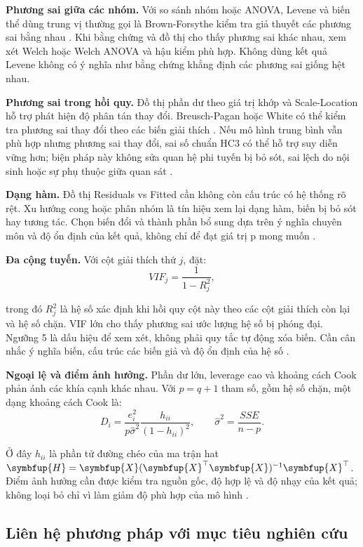 \textbf{Phương sai giữa các nhóm.} Với so sánh nhóm hoặc ANOVA, Levene và biến thể dùng trung vị thường gọi là Brown-Forsythe kiểm tra giả thuyết các phương sai bằng nhau \cite{ref16}. Khi bằng chứng và đồ thị cho thấy phương sai khác nhau, xem xét Welch hoặc Welch ANOVA và hậu kiểm phù hợp. Không dùng kết quả Levene không có ý nghĩa như bằng chứng khẳng định các phương sai giống hệt nhau.

\textbf{Phương sai trong hồi quy.} Đồ thị phần dư theo giá trị khớp và Scale-Location hỗ trợ phát hiện độ phân tán thay đổi. Breusch-Pagan hoặc White có thể kiểm tra phương sai thay đổi theo các biến giải thích \cite{ref17}. Nếu mô hình trung bình vẫn phù hợp nhưng phương sai thay đổi, sai số chuẩn HC3 có thể hỗ trợ suy diễn vững hơn; biện pháp này không sửa quan hệ phi tuyến bị bỏ sót, sai lệch do nội sinh hoặc sự phụ thuộc giữa quan sát \cite{ref18}.

\textbf{Dạng hàm.} Đồ thị Residuals vs Fitted cần không còn cấu trúc có hệ thống rõ rệt. Xu hướng cong hoặc phân nhóm là tín hiệu xem lại dạng hàm, biến bị bỏ sót hay tương tác. Chọn biến đổi và thành phần bổ sung dựa trên ý nghĩa chuyên môn và độ ổn định của kết quả, không chỉ để đạt giá trị p mong muốn \cite{ref15}.

\textbf{Đa cộng tuyến.} Với cột giải thích thứ \(j\), đặt:
\nopagebreak[4]
\[VIF_j=\frac{1}{1-R_j^2},\]

trong đó \(R_j^2\) là hệ số xác định khi hồi quy cột này theo các cột giải thích còn lại và hệ số chặn. VIF lớn cho thấy phương sai ước lượng hệ số bị phóng đại. Ngưỡng 5 là dấu hiệu để xem xét, không phải quy tắc tự động xóa biến. Cần cân nhắc ý nghĩa biến, cấu trúc các biến giả và độ ổn định của hệ số \cite{ref15}.

\textbf{Ngoại lệ và điểm ảnh hưởng.} Phần dư lớn, leverage cao và khoảng cách Cook phản ánh các khía cạnh khác nhau. Với \(p=q+1\) tham số, gồm hệ số chặn, một dạng khoảng cách Cook là:
\nopagebreak[4]
\[D_i=\frac{e_i^2}{p\hat\sigma^2}\frac{h_{ii}}{(1-h_{ii})^2},\qquad
\hat\sigma^2=\frac{SSE}{n-p}.\]

Ở đây \(h_{ii}\) là phần tử đường chéo của ma trận hat \(\symbfup{H}=\symbfup{X}(\symbfup{X}^\top\symbfup{X})^{-1}\symbfup{X}^\top\). Điểm ảnh hưởng cần được kiểm tra nguồn gốc, độ hợp lệ và độ nhạy của kết quả; không loại bỏ chỉ vì làm giảm độ phù hợp của mô hình \cite{ref15}.

\subsection{Liên hệ phương pháp với mục tiêu nghiên cứu}


